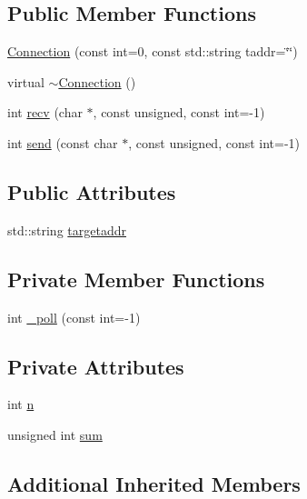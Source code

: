 \subsection*{Public Member Functions}
\begin{DoxyCompactItemize}
\item 
\hyperlink{classConnection_a3bc70a7fdfcabe58f6ca003f450e7b34}{Connection} (const int=0, const std\+::string taddr=\char`\"{}\char`\"{})
\item 
virtual \hyperlink{classConnection_a2e4352edf667bea83001569e9da8a24d}{$\sim$\+Connection} ()
\item 
int \hyperlink{classConnection_ab16b8a780c69303beec9b1f67fb596f3}{recv} (char $\ast$, const unsigned, const int=-\/1)
\item 
int \hyperlink{classConnection_a5466a66e569e81d891559686f2c7594b}{send} (const char $\ast$, const unsigned, const int=-\/1)
\end{DoxyCompactItemize}
\subsection*{Public Attributes}
\begin{DoxyCompactItemize}
\item 
std\+::string \hyperlink{classConnection_a04bb846a50a9357bab86238956940d65}{targetaddr}
\end{DoxyCompactItemize}
\subsection*{Private Member Functions}
\begin{DoxyCompactItemize}
\item 
int \hyperlink{classConnection_a4e186a7e69d56c0bb84ef56032b89427}{\+\_\+poll} (const int=-\/1)
\end{DoxyCompactItemize}
\subsection*{Private Attributes}
\begin{DoxyCompactItemize}
\item 
int \hyperlink{classConnection_af54be737cc02308299c2e80a893a3e46}{n}
\item 
unsigned int \hyperlink{classConnection_aca989af92a96ac113222d7b8640df507}{sum}
\end{DoxyCompactItemize}
\subsection*{Additional Inherited Members}


